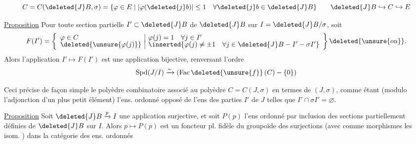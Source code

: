 \[C=C(\deleted{J}B,\sigma)=\{\varphi\in E\mid\lvert\varphi(\deleted{j}b)\rvert\leq1\quad\forall \deleted{j}b\in\deleted{J}B\}\qquad\deleted{J}B\hookrightarrow C\hookrightarrow E\]

\uline{Proposition} Pour toute section partielle \(I'\subset \deleted{J}B\) de \(\deleted{J}B\) sur \(I=\deleted{J}B/\sigma\), soit
\[F(I')=\left\{\begin{array}{l|l}\varphi\in C&\varphi(j)=1\quad\forall j\in I'\\[-2pt]\deleted{\unsure{\varphi(j)}}&\inserted{\varphi(j)\neq\pm1\quad\forall j\in \deleted{J}B-I'-\sigma I'}\end{array}\right\}\deleted{\unsure{ou}}.\]
Alors l'application \(I'\longmapsto F(I')\) est une application bijective, renversant l'ordre
\[\operatorname{Spd}(J/I)\xrightarrow{\sim}(\operatorname{Fac}\deleted{\unsure{f}}\,(C)-\{0\})\]

Ceci précise de façon simple le  polyèdre combinatoire associé au polyèdre \(C=C(J,\sigma)\) en termes de \((J,\sigma)\), comme étant (modulo l'adjonction d'un plus petit élément) l'ens. ordonné opposé de l'ens des parties \(I'\) de \(J\) telles que \(I'\cap\sigma I'=\varnothing\).


\uline{Proposition} Soit \(\deleted{J}B\xrightarrow{p} I\) une application surjective, et soit \(P(p)\) l'ens ordonné par inclusion des sections partiellement définies de \(\deleted{J}B\) sur \(I\). Alors \(p\longmapsto P(p)\) est un foncteur pl. fidèle du groupoïde des surjections (avec comme  morphismes les isom.
) dans la catégorie des ens. ordonnés

